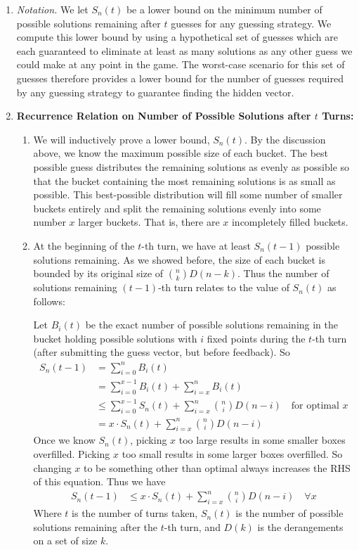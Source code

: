 \documentclass[12pt, a4paper]{article}
\begin{document}
\begin{enumerate}
	\item\textit{Notation.}
	We let $S_{n}(t)$ be a lower bound on the minimum number of possible solutions remaining
	after $t$ guesses for any guessing strategy. We compute this lower bound by using
	a hypothetical set of guesses which are each guaranteed to eliminate at least as 
	many solutions as any other guess we could make at any point in the game. 
	The worst-case scenario for this set of guesses
	therefore provides a lower bound for the number of guesses required by any
	guessing strategy to guarantee finding the hidden vector.
	
	\item\textbf{Recurrence Relation on Number of Possible Solutions after $t$ Turns:}
		\begin{enumerate}
		\item We will inductively prove a lower bound, $S_{n}(t)$. By the
		discussion above,
		we know the maximum possible size of each bucket.
		The best possible guess distributes the remaining solutions as evenly as
		possible so that the bucket containing the most remaining solutions is as
		small as possible. This best-possible distribution will fill some number of
		smaller buckets entirely and split the remaining solutions evenly
		into some number $x$ larger buckets. That is, there are $x$ incompletely
		filled buckets.
		
		\item At the beginning of the $t$-th turn, we have at least $S_{n}(t-1)$
		possible
		solutions remaining. As we showed before, the size of each bucket is bounded
		by its original size of $\binom{n}{k}D(n-k)$. Thus the number of solutions
		remaining $(t-1)$-th turn relates to the value of $S_{n}(t)$ as follows:
		
		Let $B_i(t)$ be the exact number of possible solutions remaining in the
		bucket holding possible solutions with $i$ fixed points during the
		$t$-th turn (after submitting the guess vector, but before feedback). So
		\begin{align*}
		S_{n}(t-1) & = \sum_{i = 0}^{n}B_i(t)\\
		& = \sum_{i=0}^{x-1}B_i(t) + \sum_{i=x}^{n}B_i(t)\\
		& \le \sum_{i = 0}^{x-1}S_n(t) + \sum_{i=x}^{n}\binom{n}{i}D(n-i)\quad
		\text{for optimal $x$}\\
		& = x\cdot S_{n}(t) + \sum_{i = x}^{n}\binom{n}{i}D(n-i)
		\end{align*}
		Once we know $S_{n}(t)$, picking $x$ too large results in some smaller boxes
		overfilled. Picking $x$ too small results in some larger boxes overfilled. So
		changing $x$ to be something other than optimal always increases the RHS
		of this equation. Thus we have
		\begin{align*}
		S_{n}(t-1) & \le x\cdot S_{n}(t) + \sum_{i=x}^n\binom{n}{i}D(n-i)\quad\forall x
		\end{align*}
		Where $t$ is the number of turns taken, $S_{n}(t)$ is the number of possible
		solutions remaining after the $t$-th turn, and $D(k)$ is the derangements
		on a set of size $k$.
		\end{enumerate}
		

\end{enumerate}
\end{document}
